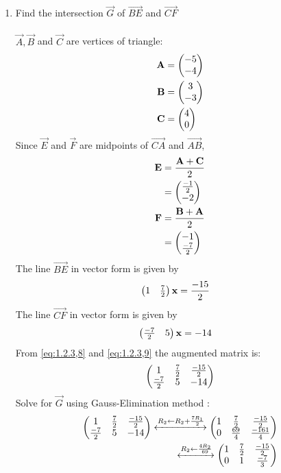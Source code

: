 \documentclass[10pt]{book}
\begin{document}
\begin{enumerate}[label=\thesection.\arabic*.,ref=\thesection.\theenumi]
\item Find the intersection $\vec{G}$ of $\vec{BE}$ and $\vec{CF}$
\\ 
\solution \\
$\vec{A},\vec{B}$ and $\vec{C}$ are vertices of triangle:
\begin{align}
    \mathbf{A} &= \begin{pmatrix}-5 \\-4\end{pmatrix} \\
    \mathbf{B} &= \begin{pmatrix}3 \\ -3\end{pmatrix} \\
    \mathbf{C} &= \begin{pmatrix}4 \\ 0\end{pmatrix}
\end{align}
Since $\vec{E}$ and $\vec{F}$ are midpoints of $\vec{CA}$ and $\vec{AB}$,
\begin{align}
    \mathbf{E} &= \frac{\mathbf{A} + \mathbf{C}}{2} \\
	&= \begin{pmatrix}\frac{-1}{2} \\-2\end{pmatrix}\\
    \mathbf{F} &= \frac{\mathbf{B} + \mathbf{A}}{2} \\ 
    &= \begin{pmatrix} -1 \\ \frac{-7}{2}\end{pmatrix}
\end{align}
The line $\vec{BE}$ in vector form is given by
\begin{align}
\myvec{1 & \frac{7}{2}} \vec{x} &= \frac{-15}{2}
\label{eq:1.2.3,8}
\end{align}
The line $\vec{CF}$ in vector form is given by
\begin{align}
\myvec{ \frac{-7}{2}& 5} \vec{x} &= -14
\label{eq:1.2.3,9}
\end{align}
From \eqref{eq:1.2.3,8} and \eqref{eq:1.2.3,9} the augmented matrix is:
\begin{align}
\begin{pmatrix}
1 & \frac{7}{2} & \frac{-15}{2} \\
\frac{-7}{2} & 5 & -14
\end{pmatrix}
\end{align}
Solve for $\vec{G}$ using Gauss-Elimination method :
\begin{align}
    \label{eq:matrowoperations}
 \myvec{
1 & \frac{7}{2} & \frac{-15}{2} \\
\frac{-7}{2} & 5 & -14
}
\xleftrightarrow[]{R_2 \leftarrow R_2+\frac{7R_1}{2}}
    \myvec{
    1 & \frac{7}{2} & \frac{-15}{2}
    \\
    0 & \frac{69}{4} & \frac{-161}{4} 
    }
    \\
     \xleftrightarrow[]{R_2\leftarrow \frac{4R_2}{69}}
    \myvec{
    1 & \frac{7}{2} & \frac{-15}{2}
    \\
    0 & 1 & \frac{-7}{3} 
}
\end{align}
\end{enumerate}
\end{document}
